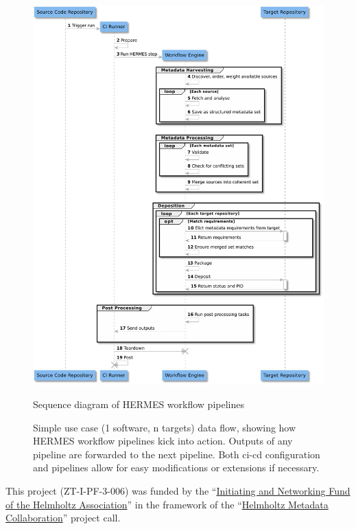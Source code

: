 \documentclass[11pt,a4paper]{scrartcl}
\begin{document}
\begin{figure}[htp]
    \centering
    \includegraphics[height=0.85\textheight]{images/workflow/HERMES_Workflow.pdf}
    
    \caption{Sequence diagram of HERMES workflow pipelines}
    \caption*{Simple use case (1 software, n targets) data flow, showing how HERMES workflow pipelines kick into action.
              Outputs of any pipeline are forwarded to the next pipeline. Both \gls{ci-cd} configuration and pipelines
              allow for easy modifications or extensions if necessary.}
    \label{fig:hermes-workflow}
\end{figure}



\clearpage
{}\label{acknowledgments}
This project (ZT-I-PF-3-006) was funded by the \enquote{\href{https://www.helmholtz.de/en/about-us/structure-and-governance/initiating-and-networking/}{Initiating and Networking Fund of the Helm\-holtz Association}}
in the framework of the \enquote{\href{https://helmholtz-metadaten.de/en}{Helmholtz Metadata Collaboration}} project call.
\end{document}
